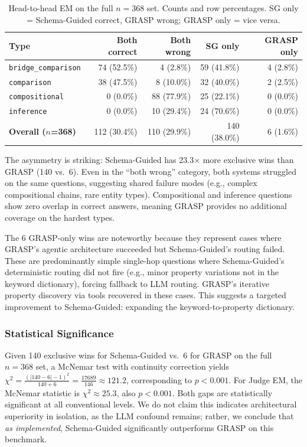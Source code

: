 \begin{table}[h]
\centering
\begin{tabular}{lrrrr}
\toprule
\textbf{Type} & \textbf{Both correct} & \textbf{Both wrong} & \textbf{SG only} & \textbf{GRASP only} \\
\midrule
\texttt{bridge\_comparison} & 74 (52.5\%) & 4 (2.8\%)  & 59 (41.8\%) & 4 (2.8\%) \\
\texttt{comparison}         & 38 (47.5\%) & 8 (10.0\%) & 32 (40.0\%) & 2 (2.5\%) \\
\texttt{compositional}      & 0  (0.0\%)  & 88 (77.9\%) & 25 (22.1\%) & 0 (0.0\%) \\
\texttt{inference}          & 0  (0.0\%)  & 10 (29.4\%) & 24 (70.6\%) & 0 (0.0\%) \\
\midrule
\textbf{Overall ($n$=368)}  & 112 (30.4\%) & 110 (29.9\%) & 140 (38.0\%) & 6 (1.6\%) \\
\bottomrule
\end{tabular}
\caption{Head-to-head EM on the full $n=368$ set. Counts and row percentages. SG only = Schema-Guided correct, GRASP wrong; GRASP only = vice versa.}
\label{tab:head-to-head-type}
\end{table}

The asymmetry is striking: Schema-Guided has 23.3$\times$ more exclusive wins than GRASP (140 vs.\ 6). Even in the ``both wrong'' category, both systems struggled on the same questions, suggesting shared failure modes (e.g., complex compositional chains, rare entity types). Compositional and inference questions show zero overlap in correct answers, meaning GRASP provides no additional coverage on the hardest types.

The 6 GRASP-only wins are noteworthy because they represent cases where GRASP's agentic architecture succeeded but Schema-Guided's routing failed. These are predominantly simple single-hop questions where Schema-Guided's deterministic routing did not fire (e.g., minor property variations not in the keyword dictionary), forcing fallback to LLM routing. GRASP's iterative property discovery via tools recovered in these cases. This suggests a targeted improvement to Schema-Guided: expanding the keyword-to-property dictionary.

\subsubsection{Statistical Significance}

Given 140 exclusive wins for Schema-Guided vs.\ 6 for GRASP on the full $n=368$ set, a McNemar test with continuity correction yields $\chi^2 = \frac{(|140 - 6| - 1)^2}{140 + 6} = \frac{17689}{146} \approx 121.2$, corresponding to $p < 0.001$. For Judge EM, the McNemar statistic is $\chi^2 \approx 25.3$, also $p < 0.001$. Both gaps are statistically significant at all conventional levels. We do not claim this indicates architectural superiority in isolation, as the LLM confound remains; rather, we conclude that \textit{as implemented}, Schema-Guided significantly outperforms GRASP on this benchmark.

